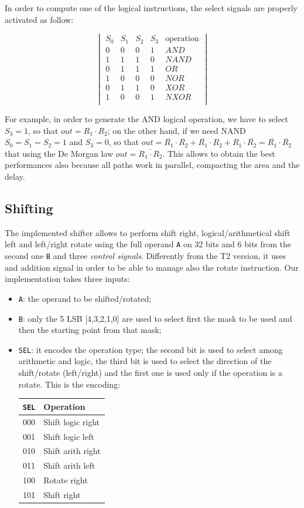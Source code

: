 	In order to compute one of the logical instructions, the select signals are properly activated as follow:
	
	\[
	\begin{vmatrix}
		S_0 & S_1 & S_2 & S_3 & \text{operation}\\
		0 & 0 & 0 & 1 & AND \\
		1 & 1 & 1 & 0 & NAND \\
		0 & 1 & 1 & 1 & OR \\
		1 & 0 & 0 & 0 & NOR \\
		0 & 1 & 1 & 0 & XOR \\
		1 & 0 & 0 & 1 & NXOR \\
	\end{vmatrix}
	\]
	
	
	For example, in order to generate the AND logical operation, we have to select $S_3 = 1$, so that $out = R_1 \cdot R_2$; on the other hand, if we need NAND $S_0 = S_1 = S_2 = 1$ and $S_3 = 0$, so that $out = \overline{R_1} \cdot \overline{R_2} + \overline{R_1} \cdot R_2 + R_1 \cdot \overline{R_2} = \overline{R_1} \cdot \overline{R_2}$ that using the De Morgan law $out = \overline{R_1 \cdot R_2}$.
	This allows to obtain the best performances also because all paths work in parallel, compacting the area and the delay.

\subsection{Shifting}
The implemented shifter allows to perform shift right, logical/arithmetical shift left and left/right rotate using the full operand \texttt{A} on 32 bits and 6 bits from the second one \texttt{B} and three \textit{control signals}.
Differently from the T2 version, it uses and addition signal in order to be able to manage also the rotate instruction. Our implementation takes three inputs:
\begin{itemize}
	\itemsep0sp
	\item \texttt{A}: the operand to be shifted/rotated;
	\item \texttt{B}: only the 5 LSB [4,3,2,1,0] are used to select first the mask to be used and then the starting point from that mask;
	\item \texttt{SEL}: it encodes the operation type; the second bit is used to select among arithmetic and logic, the third bit is used to select the direction of the shift/rotate (left/right) and the first one is used only if the operation is a rotate. This is the encoding:
	\begin{center}
		\begin{tabular}{c|l}
			\texttt{SEL} & \textbf{Operation}\\
			\hline
			000 & Shift logic right \\
			001 & Shift logic left \\
			010 & Shift arith right \\
			011 & Shift arith left \\
			100 & Rotate right \\
			101 & Shift right \\
		\end{tabular}
	\end{center}
\end{itemize}

